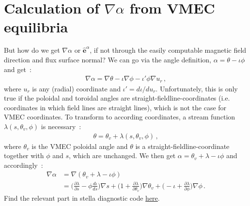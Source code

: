 
\FloatBarrier
\section{Calculation of \texorpdfstring{$\nabla\alpha$}{grad-alpha} from VMEC equilibria}
%
But how do we get $\nabla\alpha$ or $\mathbf{\hat{e}}^\alpha$,
if not through the easily computable magnetic field direction and flux surface normal?
%
We can go via the angle definition, $\alpha = \theta - \iota\phi$ and get~\cite{plunk_collisionless_2014}:
\begin{align}
 \nabla\alpha = \nabla\theta - \iota\nabla\phi - \iota'\phi\nabla u_r \, ,
\end{align}
where $u_r$ is any (radial) coordinate and $\iota' = d\iota/du_r$.
%
Unfortunately, this is only true if the poloidal and toroidal angles are straight-fieldline-coordinates
(i.e. coordinates in which field lines are straight lines),
which is not the case for VMEC coordinates.
%
To transform to according coordinates, a stream function $\lambda(s,\theta_v, \phi)$ is necessary~\cite{stella_doc}:
\begin{align}
 \theta = \theta_v + \lambda(s,\theta_v, \phi) \, ,
\end{align}
where $\theta_v$ is the VMEC poloidal angle and
$\theta$ is a straight-fieldline-coordinate together with $\phi$ and $s$,
which are unchanged.
%
We then get $\alpha = \theta_v + \lambda - \iota\phi$ and accordingly~\cite{stella_doc}:
\begin{align}
    \nabla\alpha &= \nabla(\theta_v + \lambda - \iota\phi) \\
    &=   \bigg(\frac{\partial\lambda}{\partial s}
       - \phi\frac{d\iota}{ds}\bigg)\nabla s
       + \bigg(1 + \frac{\partial\lambda}{\partial\theta_v}\bigg)\nabla\theta_v
       + \bigg(-\iota + \frac{\partial\lambda}{\partial\phi}\bigg)\nabla\phi \, .
\end{align}
%
Find the relevant part in stella diagnostic code
\href{https://github.com/stellaGK/stella/blob/master/POST_PROCESSING/stellapy/data/geometry/calculate_geometricQuantitiesVMEC.py#L738}{here}.

